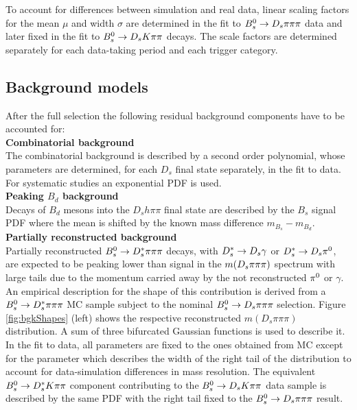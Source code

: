 To account for differences between simulation and real data, linear scaling factors for the mean $\mu$ and width $\sigma$ are determined in the fit to ${{B}^0_{s}}\rightarrow{\ensuremath{{D}_{s}}}{\ensuremath{\pi}}{\ensuremath{\pi}}{\ensuremath{\pi}}$ data  
and later fixed in the fit to ${{B}^0_{s}}\rightarrow{\ensuremath{{D}_{s}}}{\ensuremath{K}}{\ensuremath{\pi}}{\ensuremath{\pi}}$ decays. 
The scale factors are determined separately for each data-taking period and each trigger category.



\subsection{Background models} 
\label{subsec:bkgModel}

After the full selection the following residual background components have to be accounted for: \\

\noindent \textbf{Combinatorial background}  \\
The combinatorial background is described by a second order polynomial,
whose parameters are determined, for each $D_s$ final state separately, in the fit to data.
For systematic studies an exponential PDF is used.
\\

\noindent\textbf{Peaking $B_d$ background}  \\
Decays of $B_d$ mesons into the $D_s h \pi \pi$ final state are described by the $B_s$ signal PDF where the mean is shifted by the known mass difference $m_{B_s} - m_{B_d}$\cite{Agashe:2014kda}.
\\

\noindent \textbf{Partially reconstructed background}  \\
Partially reconstructed ${{B}^0_{s}}\rightarrow D_s^{*}\pi{\ensuremath{\pi}}{\ensuremath{\pi}}$ decays, with $D_s^{*}\rightarrow{\ensuremath{{D}_{s}}}\gamma$ or $D_s^{*}\rightarrow{\ensuremath{{D}_{s}}}{\ensuremath{{\pi}^0}}$,
are expected to be peaking lower than signal in the $m({{D}_{s}}{\pi}{\pi}{\pi})$ spectrum with large tails due to the %
momentum carried away by the not reconstructed ${{\pi}^0}$ or $\gamma$. 
An empirical description for the shape of this contribution is derived from a ${{B}^0_{s}}\rightarrow D_s^{*}\pi{\ensuremath{\pi}}{\ensuremath{\pi}}$ MC sample subject to the nominal ${{B}^0_{s}}\rightarrow D_s\pi{\ensuremath{\pi}}{\ensuremath{\pi}}$ selection.
Figure \ref{fig:bgkShapes} (left) shows the respective reconstructed $m(D_s\pi\pi\pi)$ distribution.
A sum of three bifurcated Gaussian functions is used to describe it.
In the fit to data, all parameters are fixed to the ones obtained from MC except for the parameter which describes the width of the right tail of the distribution to account for
data-simulation differences in mass resolution.
The equivalent ${{B}^0_{s}}\rightarrow D_s^{*}K{\pi}{\pi}$ component contributing to the ${{B}^0_{s}}\rightarrow D_s K{\pi}{\pi}$ data sample is described by the same PDF with the right tail fixed to the 
${{B}^0_{s}}\rightarrow D_s \pi{\ensuremath{\pi}}{\ensuremath{\pi}}$ result.

